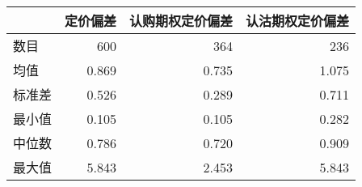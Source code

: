 \begin{tabular}{lrrr}
\toprule
{} &    定价偏差 &  认购期权定价偏差 &  认沽期权定价偏差 \\
\midrule
数目  & 600&   364 &   236\\
均值  &   0.869 &     0.735 &     1.075 \\
标准差 &   0.526 &     0.289 &     0.711 \\
最小值 &   0.105 &     0.105 &     0.282 \\
中位数 &   0.786 &     0.720 &     0.909 \\
最大值 &   5.843 &     2.453 &     5.843 \\
\bottomrule
\end{tabular}
